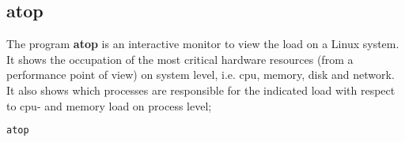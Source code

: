 \subsection{atop}
The program \textbf{atop} is an interactive monitor to view the load on a Linux system. It shows the occupation of the most critical hardware resources (from a performance point of view) on system level, i.e. cpu, memory, disk and network. It also shows which processes are responsible for the indicated load with respect to cpu- and memory load on process level;

\begin{lstlisting}[language=bash,caption={atop}]
atop
\end{lstlisting}
